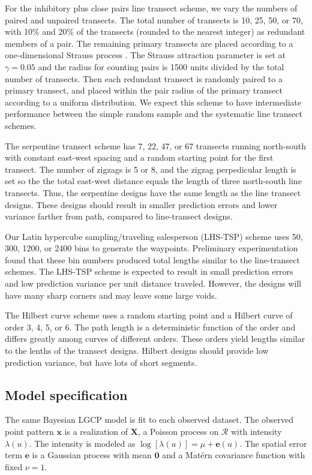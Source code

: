 \documentclass[review]{elsarticle}
\begin{document}
For the inhibitory plus close pairs line transect scheme, we vary the numbers of
paired and unpaired transects. The total number of transects is 10, 25, 50, or
70, with 10\% and 20\% of the transects (rounded to the nearest integer) as
redundant members of a pair. The remaining primary transects are placed
according to a one-dimensional Strauss process \citep{strauss,kellyripley}. The
Strauss attraction parameter is set at \(\gamma = 0.05\) and the radius for
counting pairs is 1500 units divided by the total number of transects. Then
each redundant transect is randomly paired to a primary transect, and placed
within the pair radius of the primary transect according to a uniform
distribution. We expect this scheme to have intermediate performance between
the simple random sample and the systematic line transect schemes.

The serpentine transect scheme has 7, 22, 47, or 67 transects running
north-south with constant east-west spacing and a random starting point for the
first transect. The number of zigzags is 5 or 8, and the zigzag perpedicular
length is set so the the total east-west distance equals the length of three
north-south line transects. Thus, the serpentine designs have the same length
as the line transect designs. These designs should result in smaller
prediction errors and lower variance farther from path, compared to
line-transect designs.

Our Latin hypercube sampling/traveling salesperson (LHS-TSP) scheme uses 50,
300, 1200, or 2400 bins to generate the waypoints. Preliminary experimentation
found that these bin numbers produced total lengths similar to the
line-transect schemes. The LHS-TSP scheme is expected to result in small
prediction errors and low prediction variance per unit distance traveled.
However, the designs will have many sharp corners and may leave some large
voids.

The Hilbert curve scheme uses a random starting point and a Hilbert curve of
order 3, 4, 5, or 6. The path length is a deterministic function of the order
and differs greatly among curves of different orders. These orders yield
lengths similar to the lenths of the transect designs. Hilbert designs should
provide low prediction variance, but have lots of short segments.


\subsection{Model specification}

The same Bayesian LGCP model is fit to each observed dataset. The observed
point pattern \(\mathbf{x}\) is a realization of \(\mathbf{X}\), a Poisson
process on \(\mathcal{R}\) with intensity \(\lambda(u)\). The intensity is
modeled as \(\log[\lambda(u)] = \mu + \mathbf{e}(u)\). The spatial error term
\(\mathbf{e}\) is a Gaussian process with mean \(\mathbf{0}\) and a
Mat\'{e}rn covariance function with fixed \(\nu = 1\).
\end{document}
